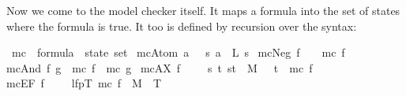 \begin{isabellebody}
\begin{isamarkuptext}
Now we come to the model checker itself. It maps a formula into the
set of states where the formula is true.  It too is defined by
recursion over the syntax:%
\end{isamarkuptext}%
\isamarkuptrue%
\isamarkupfalse%
\ mc\ {}{}\ {}formula\ {}\ state\ set{}\ \isanewline
{}mc{}Atom\ a{}\ \ {}\ {}s{}\ a\ {}\ L\ s{}{}\ {}\isanewline
{}mc{}Neg\ f{}\ \ \ {}\ {}mc\ f{}\ {}\isanewline
{}mc{}And\ f\ g{}\ {}\ mc\ f\ {}\ mc\ g{}\ {}\isanewline
{}mc{}AX\ f{}\ \ \ \ {}\ {}s{}\ {}t{}\ {}s{}t{}\ {}\ M\ \ {}\ t\ {}\ mc\ f{}{}\ {}\isanewline
{}mc{}EF\ f{}\ \ \ \ {}\ lfp{}{}T{}\ mc\ f\ {}\ {}M{}\ {}{}\ T{}{}{}%

\end{isabellebody}
